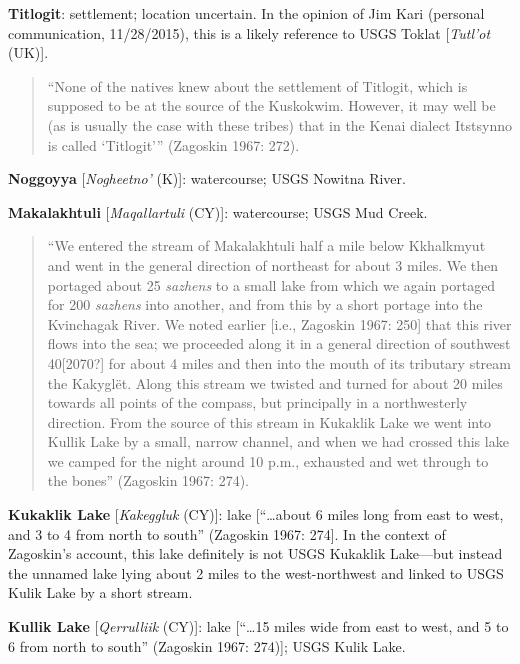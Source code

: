 \begin{hang}
\textbf{Titlogit}: settlement; location uncertain. In the opinion of Jim Kari (personal communication, 11/28/2015), this is a likely reference to USGS Toklat [\textit{Tutl’ot} (UK)].



\begin{quote}“None of the natives knew about the settlement of Titlogit, which is supposed to be at the source of the Kuskokwim. However, it may well be (as is usually the case with these tribes) that in the Kenai dialect Itstsynno is called ‘Titlogit’” (Zagoskin 1967: 272).
\end{quote}



\textbf{Noggoyya} [\textit{Nogheetno’} (K)]: watercourse; USGS Nowitna River.



\textbf{Makalakhtuli} [\textit{Maqallartuli }(CY)]: watercourse; USGS Mud Creek.



\begin{quote}“We entered the stream of Makalakhtuli half a mile below Kkhalkmyut and went in the general direction of northeast for about 3 miles. We then portaged about 25 \textit{sazhens} to a small lake from which we again portaged for 200 \textit{sazhens} into another, and from this by a short portage into the Kvinchagak River. We noted earlier [i.e., Zagoskin 1967: 250] that this river flows into the sea; we proceeded along it in a general direction of southwest 40[2070?] for about 4 miles and then into the mouth of its tributary stream the Kakyglët. Along this stream we twisted and turned for about 20 miles towards all points of the compass, but principally in a northwesterly direction. From the source of this stream in Kukaklik Lake we went into Kullik Lake by a small, narrow channel, and when we had crossed this lake we camped for the night around 10 p.m., exhausted and wet through to the bones” (Zagoskin 1967: 274).
\end{quote}



\textbf{Kukaklik Lake} [\textit{Kakeggluk }(CY)]: lake [“…about 6 miles long from east to west, and 3 to 4 from north to south” (Zagoskin 1967: 274]. In the context of Zagoskin’s account, this lake definitely is not USGS Kukaklik Lake—but instead the unnamed lake lying about 2 miles to the west-northwest and linked to USGS Kulik Lake by a short stream.



\textbf{Kullik Lake} [\textit{Qerrulliik} (CY)]: lake [“…15 miles wide from east to west, and 5 to 6 from north to south” (Zagoskin 1967: 274)]; USGS Kulik Lake.




\end{hang}
